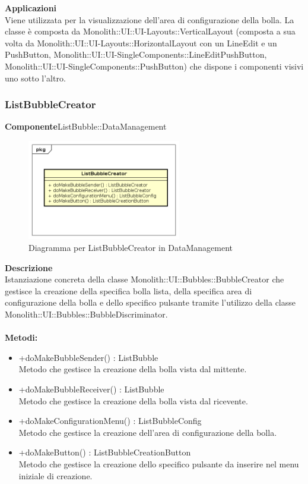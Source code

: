 \textbf{Applicazioni}\\
Viene utilizzata per la visualizzazione dell'area di configurazione della bolla. 
La classe è composta da Monolith::UI::UI-Layouts::VerticalLayout (composta a sua volta da Monolith::UI::UI-Layouts::HorizontalLayout con un LineEdit e un PushButton, Monolith::UI::UI-SingleComponents::LineEditPushButton, Monolith::UI::UI-SingleComponents::PushButton) che dispone i componenti visivi uno sotto l'altro. 


\clearpage

\subsubsection{ListBubbleCreator}
\textbf{Componente}ListBubble::DataManagement\\
   \FloatBarrier
   \begin{figure}[ht]
   \centering
   \includegraphics[width=0.6\textwidth]{img/single-ListBubbleCreator}
   \caption{{Diagramma per ListBubbleCreator in DataManagement}}
\end{figure}
\FloatBarrier
\textbf{Descrizione}\\
Istanziazione concreta della classe Monolith::UI::Bubbles::BubbleCreator che gestisce la creazione della specifica bolla lista, della specifica area di configurazione della bolla e dello specifico pulsante tramite l'utilizzo della classe Monolith::UI::Bubbles::BubbleDiscriminator.
\\
\\
\textbf{Metodi:} 
\begin{itemize}
\item +doMakeBubbleSender() : ListBubble 
\\
Metodo che gestisce la creazione della bolla vista dal mittente.
\item +doMakeBubbleReceiver() : ListBubble 
\\
Metodo che gestisce la creazione della bolla vista dal ricevente.
\item +doMakeConfigurationMenu() : ListBubbleConfig 
\\
Metodo che gestisce la creazione dell'area di configurazione della bolla.
\item +doMakeButton() : ListBubbleCreationButton 
\\
Metodo che gestisce la creazione dello specifico pulsante da inserire nel menu iniziale di creazione.
\end{itemize} 


